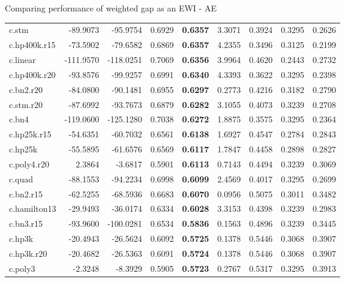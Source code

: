 \documentclass[
  ignorenonframetext,
]{beamer}
\begin{document}
\begin{frame}{Comparing performance of weighted gap as an EWI - AE}
{\begin{tabular}[t]{lrrr>{}rrrrr}
c.stm & -89.9073 & -95.9754 & 0.6929 & \textbf{0.6357} & 3.3071 & 0.3924 & 0.3295 & 0.2626\\
\addlinespace
c.hp400k.r15 & -73.5902 & -79.6582 & 0.6869 & \textbf{0.6357} & 4.2355 & 0.3496 & 0.3125 & 0.2199\\
c.linear & -111.9570 & -118.0251 & 0.7069 & \textbf{0.6356} & 3.9964 & 0.4620 & 0.2443 & 0.2732\\
c.hp400k.r20 & -93.8576 & -99.9257 & 0.6991 & \textbf{0.6340} & 4.3393 & 0.3622 & 0.3295 & 0.2398\\
c.bn2.r20 & -84.0800 & -90.1481 & 0.6955 & \textbf{0.6297} & 0.2773 & 0.4216 & 0.3182 & 0.2790\\
c.stm.r20 & -87.6992 & -93.7673 & 0.6879 & \textbf{0.6282} & 3.1055 & 0.4073 & 0.3239 & 0.2708\\
\addlinespace
c.bn4 & -119.0600 & -125.1280 & 0.7038 & \textbf{0.6272} & 1.8875 & 0.3575 & 0.3295 & 0.2364\\
c.hp25k.r15 & -54.6351 & -60.7032 & 0.6561 & \textbf{0.6138} & 1.6927 & 0.4547 & 0.2784 & 0.2843\\
c.hp25k & -55.5895 & -61.6576 & 0.6569 & \textbf{0.6117} & 1.7847 & 0.4458 & 0.2898 & 0.2827\\
c.poly4.r20 & 2.3864 & -3.6817 & 0.5901 & \textbf{0.6113} & 0.7143 & 0.4494 & 0.3239 & 0.3069\\
c.quad & -88.1553 & -94.2234 & 0.6998 & \textbf{0.6099} & 2.4569 & 0.4017 & 0.3295 & 0.2699\\
\addlinespace
c.bn2.r15 & -62.5255 & -68.5936 & 0.6683 & \textbf{0.6070} & 0.0956 & 0.5075 & 0.3011 & 0.3482\\
c.hamilton13 & -29.9493 & -36.0174 & 0.6334 & \textbf{0.6028} & 3.3153 & 0.4398 & 0.3239 & 0.2983\\
c.bn3.r15 & -93.9600 & -100.0281 & 0.6534 & \textbf{0.5836} & 0.1563 & 0.4896 & 0.3239 & 0.3445\\
c.hp3k & -20.4943 & -26.5624 & 0.6092 & \textbf{0.5725} & 0.1378 & 0.5446 & 0.3068 & 0.3907\\
c.hp3k.r20 & -20.4682 & -26.5363 & 0.6091 & \textbf{0.5724} & 0.1378 & 0.5446 & 0.3068 & 0.3907\\
\addlinespace
c.poly3 & -2.3248 & -8.3929 & 0.5905 & \textbf{0.5723} & 0.2767 & 0.5317 & 0.3295 & 0.3913\\
\bottomrule
\end{tabular}}
\end{frame}
\end{document}
